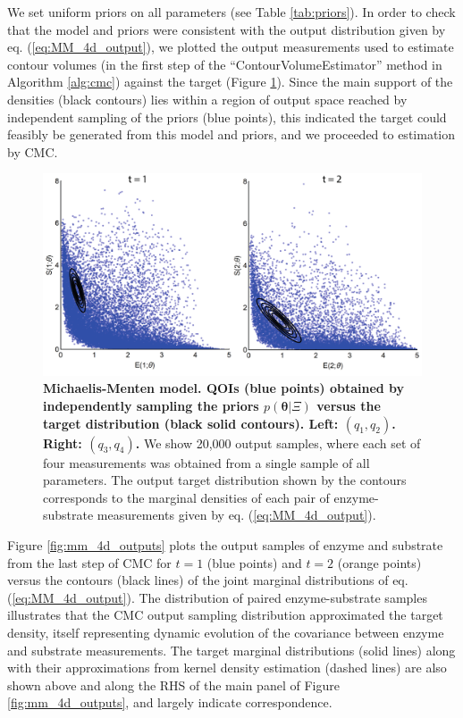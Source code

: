 We set uniform priors on all parameters (see Table \ref{tab:priors}). In order to check that the model and priors were consistent with the output distribution given by eq. (\ref{eq:MM_4d_output}), we plotted the output measurements used to estimate contour volumes (in the first step of the ``ContourVolumeEstimator'' method in Algorithm \ref{alg:cmc}) against the target (Figure \ref{fig:mm_4d_main}). Since the main support of the densities (black contours) lies within a region of output space reached by independent sampling of the priors (blue points), this indicated the target could feasibly be generated from this model and priors, and we proceeded to estimation by CMC.

\begin{figure}[H]
  \centerline{\includegraphics[width=\textwidth]{../figures/mm_4d_main.pdf}}
  \caption{\textbf{Michaelis-Menten model. QOIs (blue points) obtained by independently sampling the priors $p(\boldsymbol{\theta} | \Xi)$ versus the target distribution (black solid contours). Left: $(q_1,q_2)$. Right: $(q_3,q_4)$.} We show 20,000 output samples, where each set of four measurements was obtained from a single sample of all parameters. The output target distribution shown by the contours corresponds to the marginal densities of each pair of enzyme-substrate measurements given by eq. (\ref{eq:MM_4d_output}).}
  \label{fig:mm_4d_main}
\end{figure}

Figure \ref{fig:mm_4d_outputs} plots the output samples of enzyme and substrate from the last step of CMC for $t=1$ (blue points) and $t=2$ (orange points) versus the contours (black lines) of the joint marginal distributions of eq. (\ref{eq:MM_4d_output}). The distribution of paired enzyme-substrate samples illustrates that the CMC output sampling distribution approximated the target density, itself representing dynamic evolution of the covariance between enzyme and substrate measurements. The target marginal distributions (solid lines) along with their approximations from kernel density estimation (dashed lines) are also shown above and along the RHS of the main panel of Figure \ref{fig:mm_4d_outputs}, and largely indicate correspondence.

